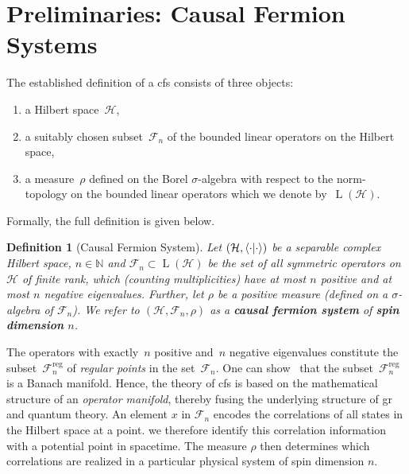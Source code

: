 \documentclass[reqno,11pt]{amsart}
\DeclareMathOperator{\Lin}{L}
\newcommand{\N}{\mathbb{N}}
\renewcommand{\H}{\mathcal{H}}
\newcommand{\F}{{\mathcal{F}}}
\newtheorem{definition}{Definition}[section]
\numberwithin{equation}{section}
\begin{document}
\section{Preliminaries: Causal Fermion Systems} \label{sec:preliminaries}

The established definition of a \ac{cfs} consists of three objects:
\begin{enumerate}
    \item a Hilbert space~$\H$,
    \item a suitably chosen subset~$\F_n$ of the bounded linear operators on the Hilbert space,
    \item a measure~$\rho$ defined on the Borel $\sigma$-algebra with respect to the norm-topology on the bounded linear
    operators which we denote by~$\Lin(\H)$.
\end{enumerate}

Formally, the full definition is given below.
\begin{definition}[Causal Fermion System]
    \label{def:cfs}
    Let $(\H, \braket{\cdot}{\cdot})$ be a separable complex Hilbert space, $n \in \N$
    and $\F_n \subset \Lin(\H)$ be the set of all symmetric operators on $\H$ of finite rank, which (counting multiplicities) have at most $n$ positive and at most $n$ negative eigenvalues.
    Further, let $\rho$ be a positive measure (defined on a $\sigma$-algebra of $\F_n$).
    We refer to $(\H, \F_n, \rho)$ as a \textbf{causal fermion system} of \textbf{spin dimension} $n$.
\end{definition}

The operators with exactly~$n$ positive and~$n$ negative eigenvalues constitute the subset~$\F_n^{\text{reg}}$ of
\textit{regular points} in the set~$\F_n$.
One can show~\cite{Finster2020, Finster2021} that the subset~$\F_n^{\text{reg}}$ is a Banach manifold.
Hence, the theory of \ac{cfs} is based on the mathematical structure of an \textit{operator manifold}, thereby fusing the
underlying structure of \ac{gr} and quantum theory.
An element $x$ in $\F_n$ encodes the correlations of all states in the Hilbert space at a point.
we therefore identify this correlation information with a potential point in spacetime.
The measure $\rho$ then determines which correlations are realized in a particular physical system of spin dimension $n$.
\end{document}
